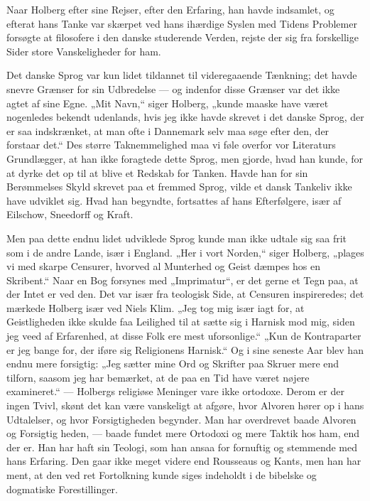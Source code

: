 \documentclass[12pt,a4paper,openany]{book}
\newcommand{\opage}[1]{\marginnote{\footnotesize\textit{[#1]}}}
\begin{document}
Naar Holberg efter sine Rejser, efter den Erfaring, han
\setcounter{footnote}{0}%
\opage{6}havde indsamlet, og efterat hans Tanke var skærpet ved hans ihærdige
Syslen med Tidens Problemer forsøgte at filosofere i den danske studerende
Verden, rejste der sig fra forskellige Sider store Vanskeligheder for ham.

Det danske Sprog var kun lidet tildannet til videregaaende Tænkning; det havde
snevre Grænser for sin Udbredelse --- og indenfor disse Grænser var det ikke
agtet af sine Egne. „Mit Navn,“ siger Holberg, „kunde maaske have været
nogenledes bekendt udenlands, hvis jeg ikke havde skrevet i det danske Sprog,
der er saa indskrænket, at man ofte i Dannemark selv maa søge efter den, der
forstaar det.“ Des større Taknemmelighed maa vi føle overfor vor Literaturs
Grundlægger, at han ikke foragtede dette Sprog, men gjorde, hvad han kunde, for
at dyrke det op til at blive et Redskab for Tanken. Havde han for sin
Berømmelses Skyld skrevet paa et fremmed Sprog, vilde et dansk Tankeliv ikke
have udviklet sig. Hvad han begyndte, fortsattes af hans Efterfølgere, især af
Eilschow, Sneedorff og Kraft.

Men paa dette endnu lidet udviklede Sprog kunde man ikke udtale sig saa frit
som i de andre Lande, især i England. „Her i vort Norden,“ siger Holberg,
„plages vi med skarpe Censurer, hvorved al Munterhed og Geist dæmpes hos en
Skribent.“ Naar en Bog forsynes med „Imprimatur“, er det gerne et Tegn paa, at
der Intet er ved den. Det var især fra teologisk Side, at Censuren
inspireredes; det mærkede Holberg især ved Niels Klim. „Jeg tog mig især iagt
for, at Geistligheden ikke skulde faa Leilighed til at sætte sig i Harnisk mod
mig, siden jeg veed af Erfarenhed, at disse Folk ere mest uforsonlige.“ „Kun de
Kontraparter er jeg bange for, der iføre sig Religionens Harnisk.“ Og i sine
seneste Aar blev han endnu mere forsigtig: „Jeg sætter mine Ord og Skrifter paa
Skruer mere end tilforn, saasom jeg har bemærket, at de paa en Tid have været
nøjere examineret.“ --- Holbergs religiøse Meninger vare ikke ortodoxe. Derom
er der ingen Tvivl, skønt det kan være vanskeligt at afgøre, hvor Alvoren hører
op i hans Udtalelser, og hvor Forsigtigheden begynder. Man har overdrevet baade
Alvoren og Forsigtig%
\setcounter{footnote}{0}%
\opage{7}heden, --- baade fundet mere Ortodoxi og mere Taktik hos ham, end der
er. Han har haft sin Teologi, som han ansaa for fornuftig og stemmende med hans
Erfaring. Den gaar ikke meget videre end Rousseaus og Kants, men han har ment,
at den ved ret Fortolkning kunde siges indeholdt i de bibelske og dogmatiske
Forestillinger.
\end{document}
